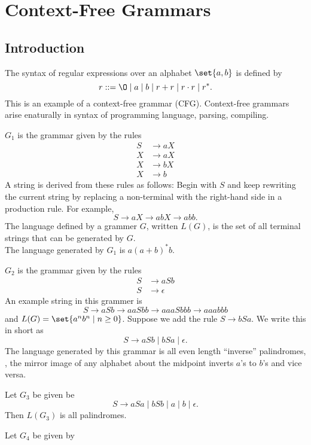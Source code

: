 \chapter{Context-Free Grammars} \label{ch:cfg}
\section{Introduction}
The syntax of regular expressions over an alphabet $\set{a, b}$ is defined
by \[
    r ::= \O \mid a \mid b \mid r + r \mid r \cdot r \mid r^*.
\] This is an example of a context-free grammar (CFG).
Context-free grammars arise enaturally in syntax of programming language,
parsing, compiling.

\begin{examples}
    \item $G_1$ is the grammar given by the rules \begin{align*}
        S &\to aX \\
        X &\to aX \\
        X &\to bX \\
        X &\to b
    \end{align*}
    A string is derived from these rules as follows:
    Begin with $S$ and keep rewriting the current string by replacing a
    non-terminal with the right-hand side in a production rule.
    For example, \[
        S \to aX \to abX \to abb.
    \] The language defined by a grammer $G$, written $L(G)$,
    is the set of all terminal strings that can be generated by $G$. \\
    The language generated by $G_1$ is $a(a+b)^*b$.
    \item $G_2$ is the grammar given by the rules \begin{align*}
        S &\to aSb \\
        S &\to \epsilon
    \end{align*}
    An example string in this grammer is \[
        S \to aSb \to aaSbb \to aaaSbbb \to aaabbb
    \] and $L(G) = \set{a^nb^n \mid n \ge 0}$.
    Suppose we add the rule $S \to bSa$.
    We write this in short as \[
        S \to aSb \mid bSa \mid \epsilon.
    \] The language generated by this grammar is all even length
    ``inverse'' palindromes, \ie, the mirror image of any alphabet about the
    midpoint inverts $a$'s to $b$'s and vice versa.
    \item Let $G_3$ be given be \[
        S \to aSa \mid bSb \mid a \mid b \mid \epsilon.
    \] Then $L(G_3)$ is all palindromes.
    \item Let $G_4$ be given by \[
\]
\end{examples}
